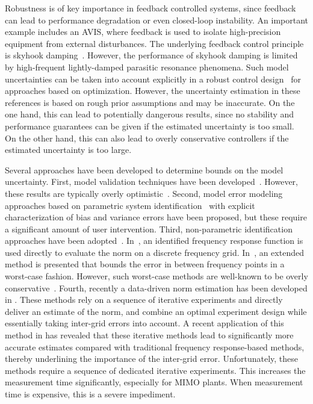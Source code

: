 Robustness is of key importance in feedback controlled systems, since feedback can lead to performance degradation or even closed-loop instability.
An important example includes an \gls{AVIS}, where feedback is used to isolate high-precision equipment from external disturbances. 
The underlying feedback control principle is skyhook damping~\citep{Karnopp1995,Collette2011}. 
However, the performance of skyhook damping is limited by high-frequent lightly-damped parasitic resonance phenomena.
Such model uncertainties can be taken into account explicitly in a robust control design~\citep{Zhang2005HybridAvis} for approaches based on \Hinf{} optimization.
However, the uncertainty estimation in these references is based on rough prior assumptions and may be inaccurate. 
On the one hand, this can lead to potentially dangerous results, since no stability and performance guarantees can be given if the estimated uncertainty is too small. 
On the other hand, this can also lead to overly conservative controllers if the estimated uncertainty is too large.

Several approaches have been developed to determine bounds on the model uncertainty. 
First, model validation techniques have been developed~\citep[see e.g.][]{Smith1992,Xu1999}.
However, these results are typically overly optimistic~\citep{Oomen2009UncEstim}.
Second, model error modeling approaches based on parametric system identification~\citep{Ljung1999MEM} with explicit characterization of bias and variance errors have been proposed, but these require a significant amount of user intervention.
Third, non-parametric identification approaches have been adopted~\citep[][see e.g.]{vandeWal2002,deVries1994}. 
In~\citet{vandeWal2002}, an identified frequency response function is used directly to evaluate the \Hinf{} norm on a discrete frequency grid. 
In~\citet{deVries1994}, an extended method is presented that bounds the error in between frequency points in a worst-case fashion. 
However, such worst-case methods are well-known to be overly conservative~\citep[Section 9.5.2]{Vinnicombe2001}. 
Fourth, recently a data-driven \Hinf{} norm estimation has been developed in \citet{Wahlberg2010,Oomen2014ILH}.
These methods rely on a sequence of iterative experiments and directly deliver an estimate of the \Hinf{} norm, and combine an optimal experiment design while essentially taking inter-grid errors into account.
A recent application of this method in \citet{Oomen2014ILH} has revealed that these iterative methods lead to significantly more accurate \Hinf{} estimates compared with traditional frequency response-based methods, thereby underlining the importance of the inter-grid error.
Unfortunately, these methods require a sequence of dedicated iterative experiments.
This increases the measurement time significantly, especially for \gls{MIMO} plants.
When measurement time is expensive, this is a severe impediment.


